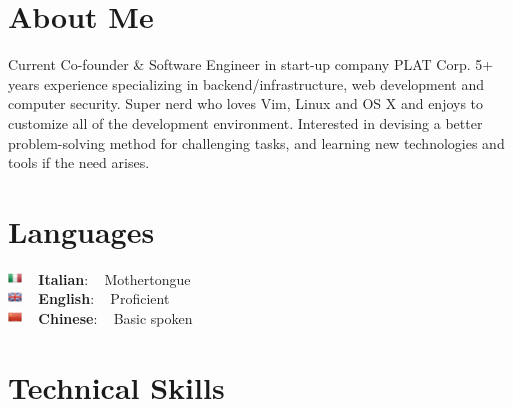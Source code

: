 \documentclass[letterpaper]{soragna-onepage-twocols} %
\begin{document}
\begin{minipage}[t]{0.3\textwidth} %


\section{About Me} 


Current Co-founder \& Software Engineer in start-up company PLAT Corp. 5+ years experience specializing in backend/infrastructure, web development and computer security. Super nerd who loves Vim, Linux and OS X and enjoys to customize all of the development environment. Interested in devising a better problem-solving method for challenging tasks, and learning new technologies and tools if the need arises.


\sectionspace %


\section{Languages} 


\includegraphics[width=1em]{images/flag/Italy.png} ~ {\bf Italian}: ~ Mothertongue\\
\includegraphics[width=1em]{images/flag/United-Kingdom.png} ~ {\bf English}: ~ Proficient\\
\includegraphics[width=1em]{images/flag/China.png} ~ {\bf Chinese}: ~ Basic spoken\\


\sectionspace %



\section{Technical Skills}


\end{minipage}
\end{document}
